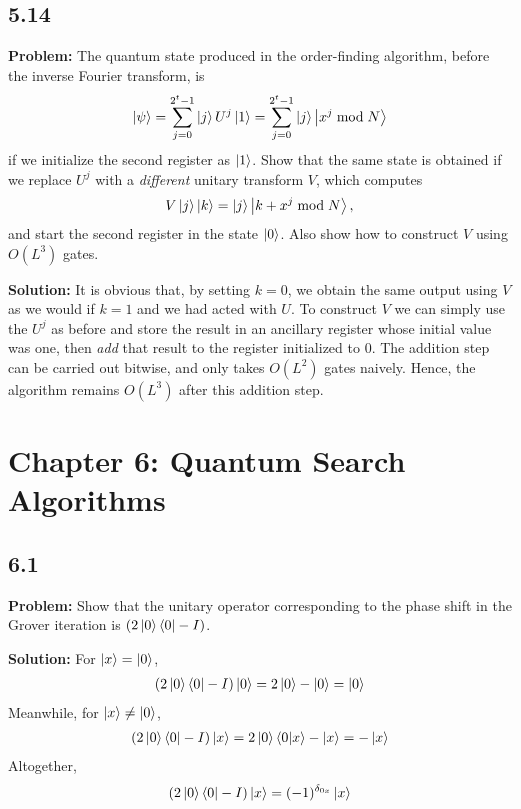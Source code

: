 \documentclass{article}
\begin{document}
\subsection*{5.14}
\textbf{Problem:} The quantum state produced in the order-finding algorithm, before
the inverse Fourier transform, is
\begin{align}
    \ket{\psi} =\sum_{j=0}^{2^t-1}\ket{j}U^j\ket{1} =\sum_{j=0}^{2^t-1}\ket{j}\ket{x^j\bmod N}
\end{align}
if we initialize the second register as $\ket{1}$. Show that the same state is obtained if we replace $U^j$ with a \emph{different} unitary transform $V$, which computes
\begin{align}
    V\ket{j}\ket{k} = \ket{j}\ket{k+x^j\bmod N},
\end{align}
and start the second register in the state $\ket{0}$. Also show how to construct $V$ using $O(L^3)$ gates.

\textbf{Solution:} It is obvious that, by setting $k=0$, we obtain the same output using $V$ as we would if $k=1$ and we had acted with $U$. To construct $V$ we can simply use the $U^j$ as before and store the result in an ancillary register whose initial value was one, then \emph{add} that result to the register initialized to 0. The addition step can be carried out bitwise, and only takes $O(L^2)$ gates naively. Hence, the algorithm remains $O(L^3)$ after this addition step.

\section*{Chapter 6: Quantum Search Algorithms}
\subsection*{6.1} 
\textbf{Problem:} Show that the unitary operator corresponding to the phase shift in the Grover iteration is $(2\ket{0}\bra{0}-I)$.

\textbf{Solution:} For $\ket{x} = \ket{0}$,
\begin{align}
    (2\ket{0}\bra{0}-I)\ket{0} = 2\ket{0}-\ket{0} = \ket{0}
\end{align}
Meanwhile, for $\ket{x} \neq \ket{0}$,
\begin{align}
    (2\ket{0}\bra{0}-I)\ket{x} = 2\ket{0}\braket{0}{x}-\ket{x} = -\ket{x}
\end{align}
Altogether,
\begin{align}
    (2\ket{0}\bra{0}-I)\ket{x} = (-1)^{\delta_{0x}}\ket{x}
\end{align}
\end{document}
